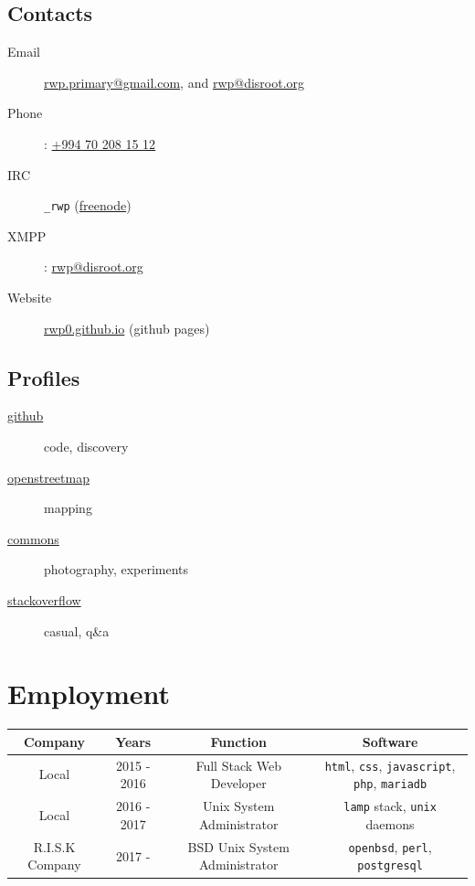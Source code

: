 \documentclass {article}
\begin{document}
     \subsection{Contacts}
       \begin{description}
         \item[Email] \href{mailto:rwp.primary@gmail.com}{rwp.primary@gmail.com}, and \href{mailto:rwp@disroot.org}{rwp@disroot.org}
         \item[Phone]: \href{tel:+994702081512}{+994 70 208 15 12}
         \item[IRC] \verb|_rwp| (\href{https://freenode.net/}{freenode})
         \item[XMPP]: \url{rwp@disroot.org}
         \item[Website] \href{https://rwp0.github.io/}{rwp0.github.io} (github pages)
       \end{description}

     \subsection{Profiles}
       \begin{description}
         \item[\href{https://github.com/rwp0}{github}] code, discovery
         \item[\href{https://www.openstreetmap.org/user/rwp_}{openstreetmap}] mapping
         \item[\href{https://commons.wikimedia.org/wiki/User:Rwp0}{commons}] photography, experiments
         \item[\href{https://stackoverflow.com/users/13762488/rwp}{stackoverflow}] casual, q\&a
       \end{description}

  \section{Employment}
    \begin{tabular}{ c | c | c | c }
      \hline			
      Company & Years & Function & Software \\
      \hline  
      Local & 2015 - 2016 & Full Stack Web Developer & \verb|html|, \verb|css|, \verb|javascript|, \verb|php|, \verb|mariadb| \\
      Local & 2016 - 2017 & Unix System Administrator & \verb|lamp| stack, \verb|unix| daemons \\
      R.I.S.K Company & 2017 - & BSD Unix System Administrator & \verb|openbsd|, \verb|perl|, \verb|postgresql| \\
      \hline  
    \end{tabular}
\end{document}
